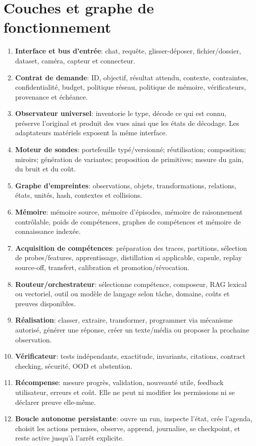 \documentclass[11pt,a4paper,oneside]{report}
\begin{document}
\section{Couches et graphe de fonctionnement}
\begin{enumerate}
\item \textbf{Interface et bus d'entrée}: chat, requête, glisser-déposer, fichier/dossier, dataset, caméra, capteur et connecteur.
\item \textbf{Contrat de demande}: ID, objectif, résultat attendu, contexte, contraintes, confidentialité, budget, politique réseau, politique de mémoire, vérificateurs, provenance et échéance.
\item \textbf{Observateur universel}: inventorie le type, décode ce qui est connu, préserve l'original et produit des vues ainsi que les états de décodage. Les adaptateurs matériels exposent la même interface.
\item \textbf{Moteur de sondes}: portefeuille typé/versionné; réutilisation; composition; miroirs; génération de variantes; proposition de primitives; mesure du gain, du bruit et du coût.
\item \textbf{Graphe d'empreintes}: observations, objets, transformations, relations, états, unités, hash, contextes et collisions.
\item \textbf{Mémoire}: mémoire source, mémoire d'épisodes, mémoire de raisonnement contrôlable, poids de compétences, graphes de compétences et mémoire de connaissance indexée.
\item \textbf{Acquisition de compétences}: préparation des traces, partitions, sélection de probes/features, apprentissage, distillation si applicable, capsule, replay source-off, transfert, calibration et promotion/révocation.
\item \textbf{Routeur/orchestrateur}: sélectionne compétence, composeur, RAG lexical ou vectoriel, outil ou modèle de langage selon tâche, domaine, coûts et preuves disponibles.
\item \textbf{Réalisation}: classer, extraire, transformer, programmer via mécanisme autorisé, générer une réponse, créer un texte/média ou proposer la prochaine observation.
\item \textbf{Vérificateur}: tests indépendants, exactitude, invariants, citations, contract checking, sécurité, OOD et abstention.
\item \textbf{Récompense}: mesure progrès, validation, nouveauté utile, feedback utilisateur, erreurs et coût. Elle ne peut ni modifier les permissions ni se déclarer preuve elle-même.
\item \textbf{Boucle autonome persistante}: ouvre un run, inspecte l'état, crée l'agenda, choisit les actions permises, observe, apprend, journalise, se checkpoint, et reste active jusqu'à l'arrêt explicite.
\end{enumerate}
\end{document}
